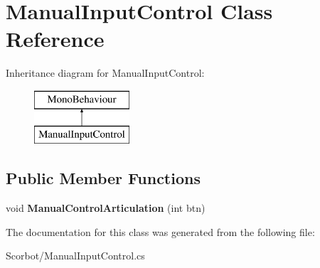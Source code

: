 \hypertarget{class_manual_input_control}{}\section{Manual\+Input\+Control Class Reference}
\label{class_manual_input_control}
Inheritance diagram for Manual\+Input\+Control\+:\begin{figure}[H]
\begin{center}
\leavevmode
\includegraphics[height=2.000000cm]{class_manual_input_control}
\end{center}
\end{figure}
\subsection*{Public Member Functions}
\begin{DoxyCompactItemize}
\item 
\mbox{\label{class_manual_input_control_a1e39de6319d6aad69e82f083d6d42058}} 
void {\bfseries Manual\+Control\+Articulation} (int btn)
\end{DoxyCompactItemize}


The documentation for this class was generated from the following file\+:\begin{DoxyCompactItemize}
\item 
Scorbot/Manual\+Input\+Control.\+cs\end{DoxyCompactItemize}
